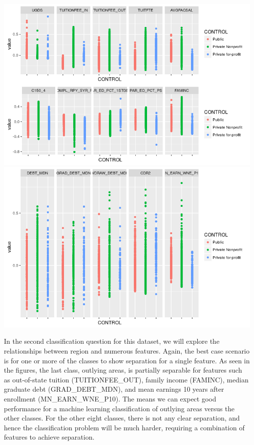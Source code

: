 \documentclass[10pt]{article}
\begin{document}
\includegraphics[width=\textwidth]{figures/control-overview1}
\includegraphics[width=\textwidth]{figures/control-overview2}

In the second classification question for this dataset, we will explore the relationships between region and numerous features. Again, the best case scenario is for one or more of the classes to show separation for a single feature. As seen in the figures, the last class, outlying areas, is partially separable for features such as out-of-state tuition (TUITIONFEE\_OUT), family income (FAMINC), median graduate debt (GRAD\_DEBT\_MDN), and mean earnings 10 years after enrollment (MN\_EARN\_WNE\_P10). The means we can expect good performance for a machine learning classification of outlying areas versus the other classes. For the other eight classes, there is not any clear separation, and hence the classification problem will be much harder, requiring a combination of features to achieve separation.\\
\end{document}
